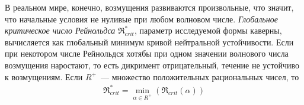 В реальном мире, конечно, возмущения развиваются произвольные, что значит, что начальные условия не нуливые при любом волновом числе. \textit{Глобальное критическое число Рейнольдса} $\Re_{crit}^*$, параметр исследуемой формы каверны, вычисляется как глобальный минимум кривой нейтральной устойчивости. Если при некотором числе Рейнольдся хотябы при одном значении волнового числа возмущения наростают, то есть дикримент отрицательный, течение не устойчиво к возмущениям. Если $R^+$~--- множество положительных рациональных чисел, то
\begin{gather}
 \Re_{crit}^* = \min_{\alpha \in R^+}(\Re_{crit}(\alpha))
\end{gather}


